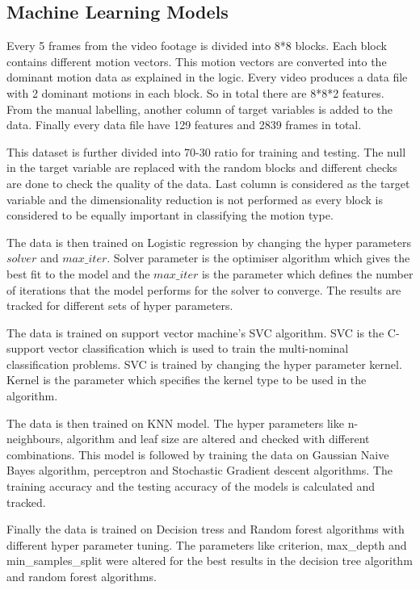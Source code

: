 \subsection{Machine Learning Models}
Every 5 frames from the video footage is divided into 8*8 blocks. Each block contains different motion vectors. This motion vectors are converted into the dominant motion data as explained in the logic. Every video produces a data file with 2 dominant motions in each block. So in total there are 8*8*2 features. From the manual labelling, another column of target variables is added to the data. Finally every data file have 129 features and 2839 frames in total.

This dataset is further divided into 70-30 ratio for training and testing. The null in the target variable are replaced with the random blocks and different checks are done to check the quality of the data. Last column is considered as the target variable and the dimensionality reduction is not performed as every block is considered to be equally important in classifying the motion type.

The data is then trained on Logistic regression by changing the hyper parameters $solver$ and $max\_iter$. Solver parameter is the optimiser algorithm which gives the best fit to the model and the $max\_iter$ is the parameter which defines the number of iterations that the model performs for the solver to converge. The results are tracked for different sets of hyper parameters.

The data is trained on support vector machine's SVC algorithm. SVC is the C-support vector classification which is used to train the multi-nominal classification problems. SVC is trained by changing the hyper parameter kernel. Kernel is the parameter which specifies the kernel type to be used in the algorithm.

The data is then trained on KNN model. The hyper parameters like n-neighbours, algorithm and leaf size are altered and checked with different combinations. This model is followed by training the data on Gaussian Naive Bayes algorithm, perceptron and Stochastic Gradient descent algorithms. The training accuracy and the testing accuracy of the models is calculated and tracked.

Finally the data is trained on Decision tress and Random forest algorithms with different hyper parameter tuning. The parameters like criterion, max\_depth and min\_samples\_split were altered for the best results in the decision tree algorithm and random forest algorithms. 



